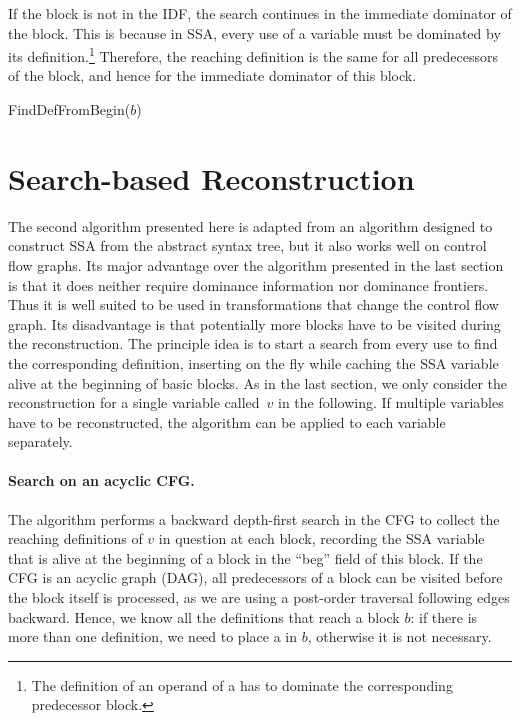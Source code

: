 {If the block is not in the IDF, the search continues in the immediate dominator of the block. 
This is because in SSA, every use of a variable must be dominated by its definition.\footnote{The definition of an operand of a \phifun has to dominate the corresponding predecessor block.}
Therefore, the reaching definition is the same for all predecessors of the block, and hence for the immediate dominator of this block.

\begin{procedure}
  \caption{FindDefFromBegin($b$)}
  \label{proc:def-from-end-ssaconstr}
\end{procedure}

\section{Search-based Reconstruction}


The second algorithm presented here is adapted from an algorithm designed to construct SSA from the abstract syntax tree, but it also works well on control flow graphs.
Its major advantage over the algorithm presented in the last section is that it does neither require dominance information nor dominance frontiers.
Thus it is well suited to be used in transformations that change the control flow graph.
Its disadvantage is that potentially more blocks have to be visited during the reconstruction.
The principle idea is to start a search from every use to find the corresponding definition, inserting \phifuns on the fly while caching the SSA variable alive at the beginning of basic blocks.
As in the last section, we only consider the reconstruction for a single variable called~$v$ in the following.
If multiple variables have to be reconstructed, the algorithm can be applied to each variable separately.

\paragraph{Search on an acyclic CFG.}
The algorithm performs a backward depth-first search in the CFG to collect the reaching definitions of $v$ in question at each block,
recording the SSA variable that is alive at the beginning of a block in the ``beg'' field of this block.
If the CFG is an acyclic graph (DAG), all predecessors of a block can be visited before the block itself is processed, as we are using a post-order traversal following edges backward.
Hence, we know all the definitions that reach a block $b$: if there is more than one definition, we need to place a \phifun in $b$, otherwise it is not necessary.

}
